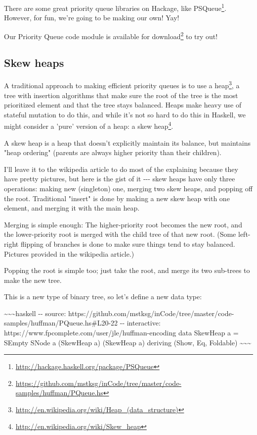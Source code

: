 \documentclass[]{article}
\renewcommand{\href}[2]{#2\footnote{\url{#1}}}
\begin{document}
There are some great priority queue libraries on Hackage, like
\href{http://hackage.haskell.org/package/PSQueue}{PSQueue}. However, for fun,
we're going to be making our own! Yay!

Our Priority Queue code module is
\href{https://github.com/mstksg/inCode/tree/master/code-samples/huffman/PQueue.hs}{available
for download} to try out!

\subsection{Skew heaps}

A traditional approach to making efficient priority queues is to use a
\href{http://en.wikipedia.org/wiki/Heap_(data_structure)}{heap}, a tree with
insertion algorithms that make sure the root of the tree is the most prioritized
element and that the tree stays balanced. Heaps make heavy use of stateful
mutation to do this, and while it's not so hard to do this in Haskell, we might
consider a 'pure' version of a heap: a
\href{http://en.wikipedia.org/wiki/Skew_heap}{skew heap}.

A skew heap is a heap that doesn't explicitly maintain its balance, but
maintains "heap ordering" (parents are always higher priority than their
children).

I'll leave it to the wikipedia article to do most of the explaining because they
have pretty pictures, but here is the gist of it -\/-\/- skew heaps have only
three operations: making new (singleton) one, merging two skew heaps, and
popping off the root. Traditional "insert" is done by making a new skew heap
with one element, and merging it with the main heap.

Merging is simple enough: The higher-priority root becomes the new root, and the
lower-priority root is merged with the child tree of that new root. (Some
left-right flipping of branches is done to make sure things tend to stay
balanced. Pictures provided in the wikipedia article.)

Popping the root is simple too; just take the root, and merge its two sub-trees
to make the new tree.

This is a new type of binary tree, so let's define a new data type:

\textasciitilde{}\textasciitilde{}\textasciitilde{}haskell -\/- source:
https://github.com/mstksg/inCode/tree/master/code-samples/huffman/PQueue.hs\#L20-22
-\/- interactive: https://www.fpcomplete.com/user/jle/huffman-encoding data
SkewHeap a = SEmpty \textbar{} SNode a (SkewHeap a) (SkewHeap a) deriving (Show,
Eq, Foldable) \textasciitilde{}\textasciitilde{}\textasciitilde{}
\end{document}
